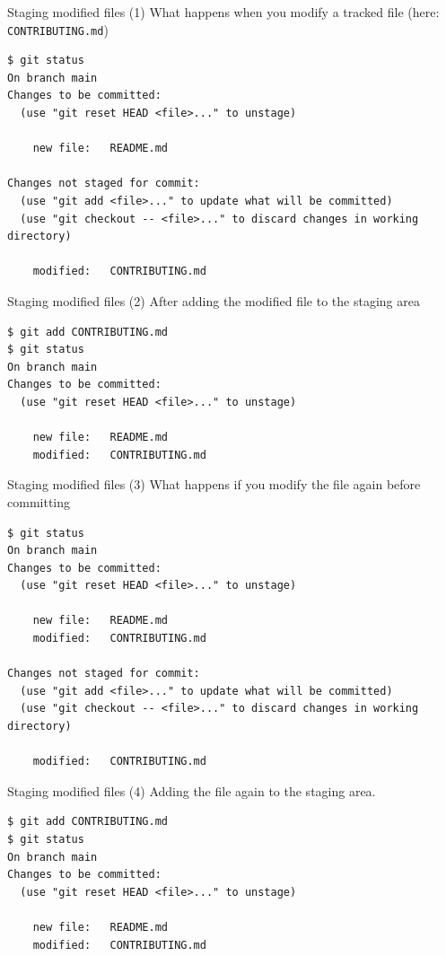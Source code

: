 \documentclass[handout]{beamer}
\begin{document}
\begin{frame}[fragile]{Staging modified files (1)}
What happens when you modify a tracked file (here: \texttt{CONTRIBUTING.md})
\begin{lstlisting}
$ git status
On branch main
Changes to be committed:
  (use "git reset HEAD <file>..." to unstage)

    new file:   README.md

Changes not staged for commit:
  (use "git add <file>..." to update what will be committed)
  (use "git checkout -- <file>..." to discard changes in working directory)

    modified:   CONTRIBUTING.md
\end{lstlisting}
\end{frame}

\begin{frame}[fragile]{Staging modified files (2)}
After adding the modified file to the staging area
\begin{lstlisting}
$ git add CONTRIBUTING.md
$ git status
On branch main
Changes to be committed:
  (use "git reset HEAD <file>..." to unstage)

    new file:   README.md
    modified:   CONTRIBUTING.md
\end{lstlisting}
\end{frame}

\begin{frame}[fragile]{Staging modified files (3)}
What happens if you modify the file again before committing
\begin{lstlisting}
$ git status
On branch main
Changes to be committed:
  (use "git reset HEAD <file>..." to unstage)

    new file:   README.md
    modified:   CONTRIBUTING.md

Changes not staged for commit:
  (use "git add <file>..." to update what will be committed)
  (use "git checkout -- <file>..." to discard changes in working directory)

    modified:   CONTRIBUTING.md
\end{lstlisting}
\end{frame}

\begin{frame}[fragile]{Staging modified files (4)}
Adding the file again to the staging area.
\begin{lstlisting}
$ git add CONTRIBUTING.md
$ git status
On branch main
Changes to be committed:
  (use "git reset HEAD <file>..." to unstage)

    new file:   README.md
    modified:   CONTRIBUTING.md
\end{lstlisting}
\end{frame}
\end{document}
